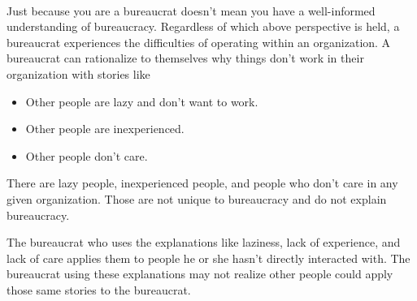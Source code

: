 \ \\

Just because you are a bureaucrat doesn't mean you have a well-informed understanding of bureaucracy. Regardless of which above perspective is held, a bureaucrat experiences the difficulties of operating within an organization. A bureaucrat can rationalize to themselves why things don't work in their organization with stories like
\begin{itemize}
\item Other people are lazy and don't want to work.
\item Other people are inexperienced.
\item Other people don't care.
\end{itemize}
There are lazy people, inexperienced people, and people who don't care in any given organization. Those are not unique to bureaucracy and do not explain bureaucracy.

The bureaucrat who uses the explanations like laziness, lack of experience, and lack of care applies them to people he or she hasn't directly interacted with.  The bureaucrat using these explanations may not realize other people could apply those same stories to the bureaucrat. 
